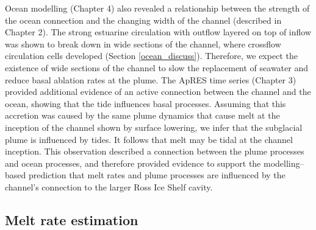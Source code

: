 Ocean modelling (Chapter 4) also revealed a relationship between the strength of the ocean connection and the changing width of the channel (described in Chapter 2). The strong estuarine circulation with outflow layered on top of inflow was shown to break down in wide sections of the channel, where crossflow circulation cells developed (Section \ref{ocean_discuss}). Therefore, we expect the existence of wide sections of the channel to slow the replacement of seawater and reduce basal ablation rates at the plume.
The ApRES time series (Chapter 3) provided additional evidence of an active connection between the channel and the ocean, showing that the tide influences basal processes. Assuming that this accretion was caused by the same plume dynamics that cause melt at the inception of the channel shown by surface lowering, we infer that the subglacial plume is influenced by tides. It follows that melt may be tidal at the channel inception.
This observation described a connection between the plume processes and ocean processes, and therefore provided evidence to support the modelling--based prediction that melt rates and plume processes are influenced by the channel's connection to the larger Ross Ice Shelf cavity. 

\subsection{Melt rate estimation}

